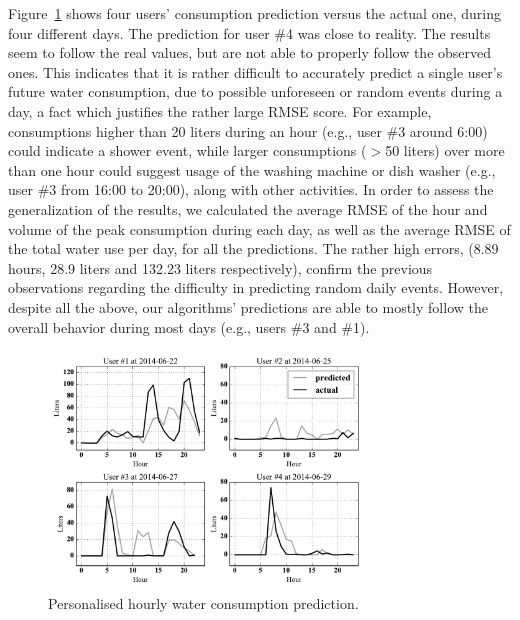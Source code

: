 Figure~\ref{figure8} shows four users' consumption prediction versus the actual one, during four different days. The prediction for user \#4 was close to reality. The results seem to follow the real values, but are not able to properly follow the observed ones. This indicates that it is rather difficult to accurately predict a single user's future water consumption, due to possible unforeseen or random events during a day, a fact which justifies the rather large RMSE score. For example, consumptions higher than 20 liters during an hour (e.g., user \#3 around 6:00) could indicate a shower event, while larger consumptions ($>$50 liters) over more than one hour could suggest usage of the washing machine or dish washer (e.g., user \#3 from 16:00 to 20:00), along with other activities. In order to assess the generalization of the results, we calculated the average RMSE of the hour and volume of the peak consumption during each day, as well as the average RMSE of the total water use per day, for all the predictions. The rather high errors, (8.89 hours, 28.9 liters and 132.23 liters respectively), confirm the previous observations regarding the difficulty in predicting random daily events. However, despite all the above, our algorithms' predictions are able to mostly follow the overall behavior during most days (e.g., users \#3 and \#1). 

\begin{figure}[!ht]
	\centering
	\includegraphics[width=0.75\textwidth]{figures/figure8.pdf}
	\caption{Personalised hourly water consumption prediction.}	
	\label{figure8}
\end{figure}

